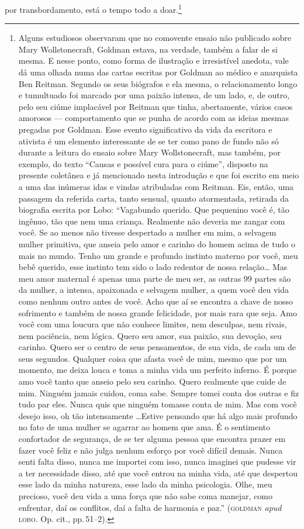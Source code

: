 por transbordamento, está o tempo todo a doar.\footnote{Alguns
  estudiosos observaram que no comovente ensaio não publicado sobre Mary
  Wollstonecraft, Goldman estava, na verdade, também a falar de si
  mesma. E nesse ponto, como forma de ilustração e irresistível anedota,
  vale dá uma olhada numa das cartas escritas por Goldman ao médico e
  anarquista Ben Reitman. Segundo os seus biógrafos e ela mesma, o
  relacionamento longo e tumultuado foi marcado por uma paixão intensa,
  de um lado, e, de outro, pelo seu ciúme implacável por Reitman que
  tinha, abertamente, vários casos amorosos --- comportamento que se
  punha de acordo com as ideias mesmas pregadas por Goldman. Esse evento
  significativo da vida da escritora e ativista é um elemento
  interessante de se ter como pano de fundo não só durante a leitura do
  ensaio sobre Mary Wollstonecraft, mas também, por exemplo, do texto
  ``Causas e possível cura para o ciúme'', disposto na presente
  coletânea e já mencionado nesta introdução e que foi escrito em meio a
  uma das inúmeras idas e vindas atribuladas com Reitman. Eis, então,
  uma passagem da referida carta, tanto sensual, quanto atormentada,
  retirada da biografia escrita por Lobo: ``Vagabundo querido. Que
  pequenino você é, tão ingênuo, tão que nem uma criança. Realmente não
  deveria me zangar com você. Se ao menos não tivesse despertado a
  mulher em mim, a selvagem mulher primitiva, que anseia pelo amor e
  carinho do homem acima de tudo o mais no mundo. Tenho um grande e
  profundo instinto materno por você, meu bebê querido, esse instinto
  tem sido o lado redentor de nossa relação\ldots{} Mas meu amor maternal é
  apenas uma parte de meu ser, as outras 99 partes são da mulher, a
  intensa, apaixonada e selvagem mulher, a quem você deu vida como
  nenhum outro antes de você. Acho que aí se encontra a chave de nosso
  sofrimento e também de nossa grande felicidade, por mais rara que
  seja. Amo você com uma loucura que não conhece limites, nem desculpas,
  nem rivais, nem paciência, nem lógica. Quero seu amor, sua paixão, sua
  devoção, seu carinho. Quero ser o centro de seus pensamentos, de sua
  vida, de cada um de seus segundos. Qualquer coisa que afasta você de
  mim, mesmo que por um momento, me deixa louca e toma a minha vida um
  perfeito inferno. É porque amo você tanto que anseio pelo seu carinho.
  Quero realmente que cuide de mim. Ninguém jamais cuidou, coma sabe.
  Sempre tomei conta dos outras e fiz tudo par eles. Nunca quis que
  ninguém tomasse conta de mim. Mas com você desejo isso, oh tão
  intensamente \ldots Estive pensando que há algo mais profundo no fato de
  uma mulher se agarrar ao homem que ama. É o sentimento confortador de
  segurança, de se ter alguma pessoa que encontra prazer em fazer você
  feliz e não julga nenhum esforço por você difícil demais. Nunca senti
  falta disso, nunca me importei com isso, nunca imaginei que pudesse
  vir a ter necessidade disso, até que você entrou na minha vida, até
  que despertou esse lado da minha natureza, esse lado da minha
  psicologia. Olhe, meu precioso, você deu vida a uma força que não sabe
  coma manejar, como enfrentar, daí os conflitos, daí a falta de
  harmonia e paz.'' (\textsc{goldman} \textit{apud} \textsc{lobo}. Op. cit., pp.\,51--2).}

